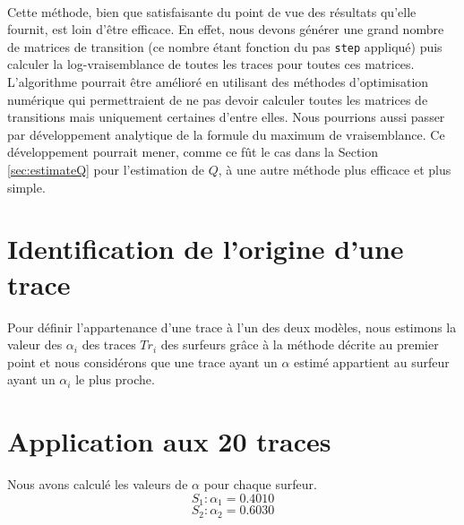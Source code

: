 \documentclass[a4paper,titlepage]{report}
\begin{document}
\paragraph{}
Cette méthode, bien que satisfaisante du point de vue des résultats qu'elle fournit, est loin d'être efficace. En effet, nous devons générer une grand nombre de matrices de transition (ce nombre étant fonction du pas \texttt{step} appliqué) puis calculer la log-vraisemblance de toutes les traces pour toutes ces matrices. L'algorithme pourrait être amélioré en utilisant des méthodes d'optimisation numérique qui permettraient de ne pas devoir calculer toutes les matrices de transitions mais uniquement certaines d'entre elles. Nous pourrions aussi passer par développement analytique de la formule du maximum de vraisemblance. Ce développement pourrait mener, comme ce fût le cas dans la Section \ref{sec:estimateQ} pour l'estimation de $Q$, à une autre méthode plus efficace et plus simple.

\section{Identification de l'origine d'une trace}
Pour définir l'appartenance d'une trace à l'un des deux modèles, nous estimons la valeur des $\alpha_i$ des traces $Tr_i$ des surfeurs grâce à la méthode décrite au premier point et nous considérons que une trace ayant un $\alpha$ estimé appartient au surfeur ayant un $\alpha_i$ le plus proche.

\section{Application aux 20 traces}
Nous avons calculé les valeurs de $\alpha$ pour chaque surfeur.
$$ S_1 : \alpha_1 =  0.4010 $$
$$ S_2 : \alpha_2 =  0.6030  $$
                                 
\end{document}
